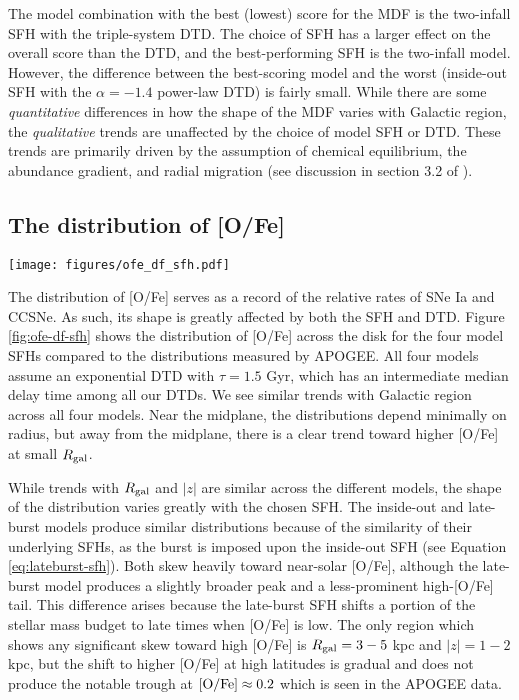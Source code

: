 \documentclass[twocolumn,twocolappendix,linenumbers]{aastex631}
\begin{document}
The model combination with the best (lowest) score for the MDF is the two-infall SFH with the triple-system DTD. The choice of SFH has a larger effect on the overall score than the DTD, and the best-performing SFH is the two-infall model. However, the difference between the best-scoring model and the worst (inside-out SFH with the $\alpha=-1.4$ power-law DTD) is fairly small. While there are some {\it quantitative} differences in how the shape of the MDF varies with Galactic region, the {\it qualitative} trends are unaffected by the choice of model SFH or DTD. These trends are primarily driven by the assumption of chemical equilibrium, the abundance gradient, and radial migration (see discussion in section 3.2 of ).

\subsection{The distribution of [O/Fe]}
\label{sec:ofe-df}

\begin{figure*}
    \centering
    \texttt{[image: figures/ofe\_df\_sfh.pdf]}
    \caption{Distributions of [O/Fe] from multi-zone models with different SFHs. All assume the exponential ($\tau=1.5$ Gyr) DTD. The format of each panel is the same as in Figure \ref{fig:feh-df-comparison}, except that all distributions are smoothed with a box-car width of 0.05 dex. Distributions from APOGEE DR17, binned and smoothed similarly, are presented in the right-most column for reference.}
    \label{fig:ofe-df-sfh}
\end{figure*}

The distribution of [O/Fe] serves as a record of the relative rates of SNe Ia and CCSNe. As such, its shape is greatly affected by both the SFH and DTD. Figure \ref{fig:ofe-df-sfh} shows the distribution of [O/Fe] across the disk for the four model SFHs compared to the distributions measured by APOGEE. All four models assume an exponential DTD with $\tau=1.5$ Gyr, which has an intermediate median delay time among all our DTDs. We see similar trends with Galactic region across all four models. Near the midplane, the distributions depend minimally on radius, but away from the midplane, there is a clear trend toward higher [O/Fe] at small $R_{\rm gal}$.

While trends with $R_{\rm gal}$ and $|z|$ are similar across the different models, the shape of the distribution varies greatly with the chosen SFH. The inside-out and late-burst models produce similar distributions because of the similarity of their underlying SFHs, as the burst is imposed upon the inside-out SFH (see Equation \ref{eq:lateburst-sfh}). Both skew heavily toward near-solar [O/Fe], although the late-burst model produces a slightly broader peak and a less-prominent high-[O/Fe] tail. This difference arises because the late-burst SFH shifts a portion of the stellar mass budget to late times when [O/Fe] is low. The only region which shows any significant skew toward high [O/Fe] is $R_{\rm gal}=3-5$ kpc and $|z|=1-2$ kpc, but the shift to higher [O/Fe] at high latitudes is gradual and does not produce the notable trough at ${\rm [O/Fe]}\approx0.2$ which is seen in the APOGEE data. 
\end{document}
